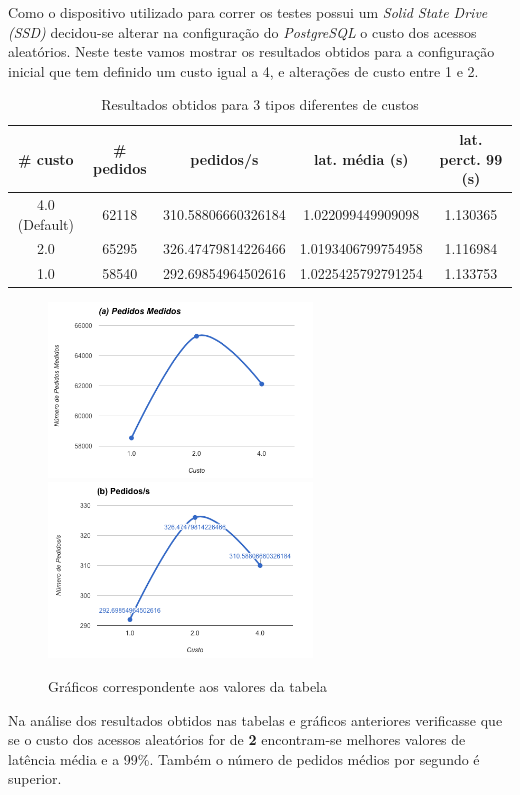 Como o dispositivo utilizado para correr os testes possui um \textit{Solid State Drive (SSD)} decidou-se alterar na configuração do \textit{PostgreSQL} o custo dos acessos aleatórios. Neste teste vamos mostrar os resultados obtidos para a configuração inicial que tem definido um custo igual a 4, e alterações de custo entre 1 e 2.

\begin{table}[!h]
\center
\small
\begin{tabular}{|c|c|c|c|c|}
\hline
\textbf{\# custo} & \textbf{\# pedidos} & \textbf{pedidos/s} & \textbf{lat. média (s)} & \textbf{lat. perct. 99 (s)}  \\ \hline
4.0 (Default) & 62118 & 310.58806660326184 & 1.022099449909098 & 1.130365  \\ \hline
2.0 & 65295 & 326.47479814226466 & 1.0193406799754958 & 1.116984  \\ \hline
1.0 & 58540 & 292.69854964502616 & 1.0225425792791254 & 1.133753  \\ \hline
\end{tabular}
\caption{Resultados obtidos para 3 tipos diferentes de custos}
\end{table}

\begin{figure}[ht!]
\centering
\includegraphics[width=70mm]{img/07_rpc_a.png}
\includegraphics[width=70mm]{img/07_rpc_b.png}
\caption{Gráficos correspondente aos valores da tabela \label{overflow}}
\end{figure}

Na análise dos resultados obtidos nas tabelas e gráficos anteriores verificasse que se o custo dos acessos aleatórios for de \textbf{2} encontram-se melhores valores de latência média e a 99\%. Também o número de pedidos médios por segundo é superior.


